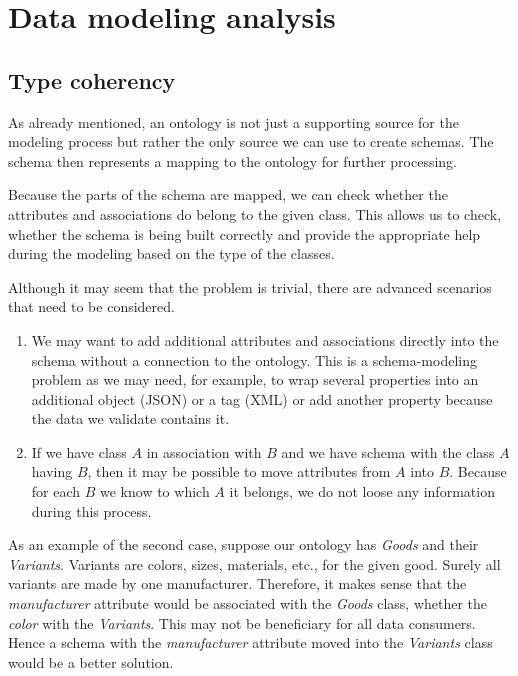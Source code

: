 \section{Data modeling analysis}

\subsection{Type coherency}

As already mentioned, an ontology is not just a supporting source for the modeling process but rather the only source we can use to create schemas. The schema then represents a mapping to the ontology for further processing.

Because the parts of the schema are mapped, we can check whether the attributes and associations do belong to the given class. This allows us to check, whether the schema is being built correctly and provide the appropriate help during the modeling based on the type of the classes.

Although it may seem that the problem is trivial, there are advanced scenarios that need to be considered.

\begin{enumerate}
  \item We may want to add additional attributes and associations directly into the schema without a connection to the ontology. This is a schema-modeling problem as we may need, for example, to wrap several properties into an additional object (JSON) or a tag (XML) or add another property because the data we validate contains it.
  \item If we have class $A$ in association with $B$ and we have schema with the class $A$ having $B$, then it may be possible to move attributes from $A$ into $B$. Because for each $B$ we know to which $A$ it belongs, we do not loose any information during this process.
\end{enumerate}

As an example of the second case, suppose our ontology has \textit{Goods} and their \textit{Variants}. Variants are colors, sizes, materials, etc., for the given good. Surely all variants are made by one manufacturer. Therefore, it makes sense that the \textit{manufacturer} attribute would be associated with the \textit{Goods} class, whether the \textit{color} with the \textit{Variants}. This may not be beneficiary for all data consumers. Hence a schema with the \textit{manufacturer} attribute moved into the \textit{Variants} class would be a better solution.

